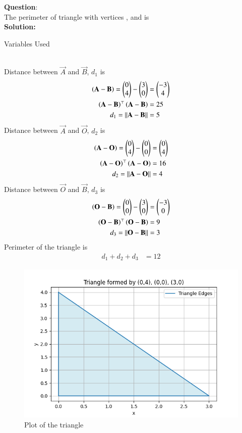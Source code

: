 \documentclass[journal]{IEEEtran}
\begin{document}
\textbf{Question}:\\
The perimeter of triangle with vertices , and  is
\\
\textbf{Solution: }
\begin{table}[h!]    
  \centering
  
  \caption{Variables Used}
  \label{tab10.5.3.9.1}
\end{table}\\
Distance between $\vec{A}$ and $\vec{B}$, $d_1$ is
\begin{align}
	\left(\mathbf{A} - \mathbf{B}\right) = \begin{pmatrix}0\\4\end{pmatrix} - \begin{pmatrix}3\\0\end{pmatrix} &= \begin{pmatrix}-3\\4\end{pmatrix}\\
	\left(\mathbf{A-B}\right)^\top\left(\mathbf{A-B}\right)&=25\\
    d_1=||\mathbf{A}-\mathbf{B}||&=5
\end{align}
Distance between $\vec{A}$ and $\vec{O}$, $d_2$ is
\begin{align}
	\left(\mathbf{A} - \mathbf{O}\right) = \begin{pmatrix}0\\4\end{pmatrix} - \begin{pmatrix}0\\0\end{pmatrix} &= \begin{pmatrix}0\\4\end{pmatrix}\\
	\left(\mathbf{A-O}\right)^\top\left(\mathbf{A-O}\right)&=16\\
    d_2=||\mathbf{A}-\mathbf{O}||&=4
\end{align}
Distance between $\vec{O}$ and $\vec{B}$, $d_3$ is
\begin{align}
	\left(\mathbf{O} - \mathbf{B}\right) = \begin{pmatrix}0\\0\end{pmatrix} - \begin{pmatrix}3\\0\end{pmatrix} &= \begin{pmatrix}-3\\0\end{pmatrix}\\
	\left(\mathbf{O-B}\right)^\top\left(\mathbf{O-B}\right)&=9\\
    d_3=||\mathbf{O}-\mathbf{B}||&=3
\end{align}
Perimeter of the triangle is 
\begin{align}
    d_1+d_2+d_3&=12
\end{align}
\begin{figure}[h!]
   \centering
   \includegraphics[width=0.7\linewidth]{figs/fig.png}
   \caption{Plot of the triangle}
   \label{stemplot}
\end{figure}
\end{document}
